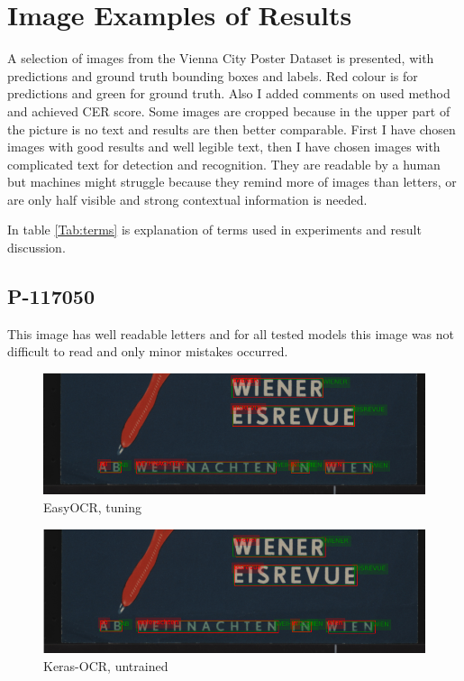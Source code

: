 \section*{Image Examples of Results}

A selection of images from the Vienna City Poster Dataset is presented, with predictions and ground truth bounding boxes and labels. Red colour is for predictions and green for ground truth. Also I added comments on used method and achieved CER score. Some images are cropped because in the upper part of the picture is no text and results are then better comparable. First I have chosen images with good results and well legible text, then I have chosen images with complicated text for detection and recognition. They are readable by a human but machines might struggle because they remind more of images than letters, or are only half visible and strong contextual information is needed. 

In table \ref{Tab:terms} is explanation of terms used in experiments and result discussion.

\subsection*{P-117050}
This image has well readable letters and for all tested models this image was not difficult to read and only minor mistakes occurred.

\begin{figure}[hbtp!]
    \centering
    \includegraphics[scale=0.36]{obrazky/plakaty/result_easyOCR_vienna1_split_tuning_special_sensitive-21.png}
    \caption{EasyOCR, tuning}
    \label{Im2:ex:easy}
\end{figure}

\begin{figure}[hbtp!]
    \centering
    \includegraphics[scale=0.36]{obrazky/plakaty/result_kerasOCR_vienna1_nosplit_nocorrection-21.png}
    \caption{Keras-OCR, untrained}
    \label{Im2:ex:keras}
\end{figure}

